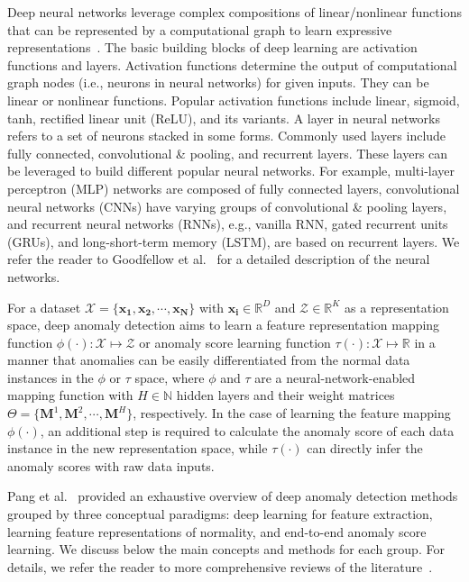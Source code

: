 Deep neural networks leverage complex compositions of linear/nonlinear functions that can be represented by a computational graph to learn expressive representations~\cite{Goodfellow-et-al-2016}. The basic building blocks of deep learning are activation functions and layers. Activation functions determine the output of computational graph nodes (i.e., neurons in neural networks) for given inputs. They can be linear or nonlinear functions. Popular activation functions include linear, sigmoid, tanh, rectified linear unit (ReLU), and its variants. A layer in neural networks refers to a set of neurons stacked in some forms. Commonly used layers include fully connected, convolutional \& pooling, and recurrent layers. These layers can be leveraged to build different popular neural networks. For example, multi-layer perceptron (MLP) networks are composed of fully connected layers, convolutional neural networks (CNNs) have varying groups of convolutional \& pooling layers, and recurrent neural networks (RNNs), e.g., vanilla RNN, gated recurrent units (GRUs), and long-short-term memory (LSTM), are based on recurrent layers. We refer the reader to Goodfellow et al.~\cite{Goodfellow-et-al-2016} for a detailed description of the neural networks.

For a dataset $\mathcal{X} =\{\mathbf{x_1}, \mathbf{x_2}, \cdots, \mathbf{x_N}\}$ with $\mathbf{x_i} \in \mathbb{R}^{D}$ and $\mathcal{Z} \in \mathbb{R}^{K}$ as a representation space, deep anomaly detection aims to learn a feature representation mapping function $\phi(\cdot): \mathcal{X} \mapsto \mathcal{Z}$ or anomaly score learning function $\tau(\cdot):\mathcal{X} \mapsto \mathbb{R}$ in a manner that anomalies can be easily differentiated from the normal data instances in the $\phi$ or $\tau$ space, where $\phi$ and $\tau$ are a neural-network-enabled mapping function with $H \in \mathbb{N}$ hidden layers and their weight matrices $\Theta=\{\mathbf{M}^{1}, \mathbf{M}^{2}, \cdots, \mathbf{M}^{H}\}$, respectively. In the case of learning the feature mapping $\phi(\cdot)$, an additional step is required to calculate the anomaly score of each data instance in the new representation space, while $\tau(\cdot)$ can directly infer the anomaly scores with raw data inputs. 

Pang et al.~\cite{pang2020deep} provided an exhaustive overview of deep anomaly detection methods grouped by three conceptual paradigms: deep learning for feature extraction, learning feature representations of normality, and end-to-end anomaly score learning. We discuss below the main concepts and methods for each group. For details, we refer the reader to more comprehensive reviews of the literature~\cite{pang2020deep,chalapathy2019deep,ruff2020unifying}.

